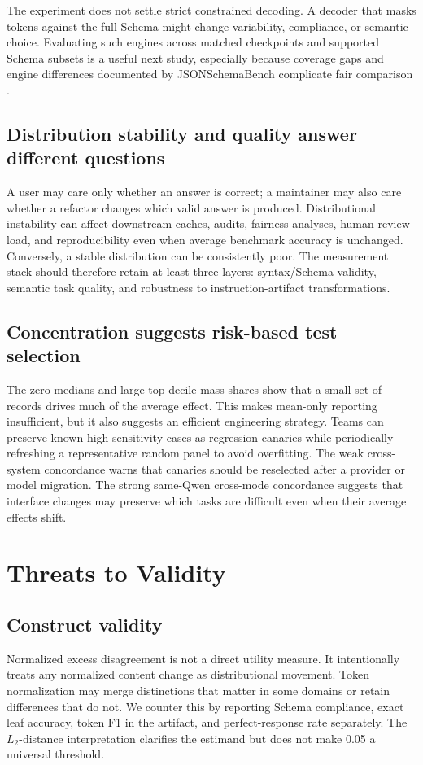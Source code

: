 \documentclass[11pt,a4paper]{article}
\begin{document}
The experiment does not settle strict constrained decoding. A decoder that masks tokens against the full Schema might change variability, compliance, or semantic choice. Evaluating such engines across matched checkpoints and supported Schema subsets is a useful next study, especially because coverage gaps and engine differences documented by JSONSchemaBench complicate fair comparison \citep{geng2025jsonschemabench}.

\subsection{Distribution stability and quality answer different questions}
A user may care only whether an answer is correct; a maintainer may also care whether a refactor changes which valid answer is produced. Distributional instability can affect downstream caches, audits, fairness analyses, human review load, and reproducibility even when average benchmark accuracy is unchanged. Conversely, a stable distribution can be consistently poor. The measurement stack should therefore retain at least three layers: syntax/Schema validity, semantic task quality, and robustness to instruction-artifact transformations.

\subsection{Concentration suggests risk-based test selection}
The zero medians and large top-decile mass shares show that a small set of records drives much of the average effect. This makes mean-only reporting insufficient, but it also suggests an efficient engineering strategy. Teams can preserve known high-sensitivity cases as regression canaries while periodically refreshing a representative random panel to avoid overfitting. The weak cross-system concordance warns that canaries should be reselected after a provider or model migration. The strong same-Qwen cross-mode concordance suggests that interface changes may preserve which tasks are difficult even when their average effects shift.

\section{Threats to Validity}
\subsection{Construct validity}
Normalized excess disagreement is not a direct utility measure. It intentionally treats any normalized content change as distributional movement. Token normalization may merge distinctions that matter in some domains or retain differences that do not. We counter this by reporting Schema compliance, exact leaf accuracy, token F1 in the artifact, and perfect-response rate separately. The \(L_2\)-distance interpretation clarifies the estimand but does not make 0.05 a universal threshold.
\end{document}
